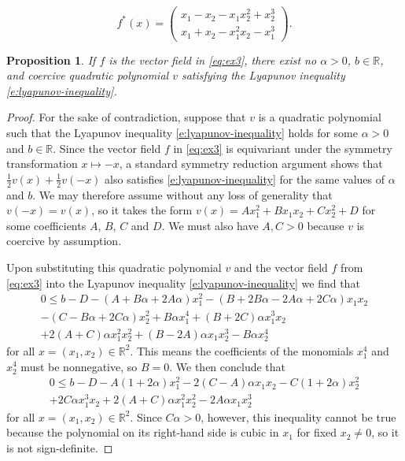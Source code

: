 \documentclass[10pt,a4paper]{amsart}
\newtheorem{proposition}{Proposition}
\newcommand{\R}{\mathbb{R}}
\renewcommand{\vec}[1]{{#1}}
\begin{document}
\begin{equation}\label{eq:ex3}
f^*(\vec{x}) =
\begin{pmatrix}
x_1 - x_2 - x_1 x_2^{2} + x_2^{3} \\
x_1 + x_2 - x_1^{2} x_2 - x_1^{3}
\end{pmatrix}.
\end{equation}

\begin{proposition}
    If $f$ is the vector field in \cref{eq:ex3}, there exist no $\alpha>0$, $b\in \R$, and coercive quadratic polynomial $v$ satisfying the Lyapunov inequality \cref{e:lyapunov-inequality}.
\end{proposition} 

\begin{proof}
    For the sake of contradiction, suppose that $v$ is a quadratic polynomial such that the Lyapunov inequality \cref{e:lyapunov-inequality} holds for some $\alpha>0$ and $b\in\R$.
    Since the vector field $\vec{f}$ in \cref{eq:ex3} is equivariant under the symmetry transformation $x\mapsto -x$, a standard symmetry reduction argument shows that $\frac12 v(\vec{x})+ \frac12v(-\vec{x})$ also satisfies \cref{e:lyapunov-inequality} for the same values of $\alpha$ and $b$. We may therefore assume without any loss of generality that $v(-\vec{x})=v(\vec{x})$, so it takes the form
    $v(x) = A x_1^2 + B x_1 x_2 + C x_2^2 + D$ 
    for some coefficients $A$, $B$, $C$ and $D$. We must also have $A,C>0$ because $v$ is coercive by assumption.
    
    Upon substituting this quadratic polynomial $v$ and the vector field $\vec{f}$ from \cref{eq:ex3} into the Lyapunov inequality \cref{e:lyapunov-inequality} we find that
    \begin{align*}
        0\leq 
        b - D
        - (A + B\alpha +2A\alpha)x_1^2 
        - (B+2B\alpha-2A\alpha+2C\alpha)x_1 x_2
        \\
        - (C - B\alpha +2C\alpha) x_2^2 
        + B\alpha x_1^4 
        + (B + 2C)\alpha x_1^3 x_2
        \\
        + 2(A+C)\alpha x_1^2 x_2^2
        + (B - 2A)\alpha x_1 x_2^3
        - B \alpha x_2^4
    \end{align*}
    for all $\vec{x}=(x_1,x_2)\in\R^2$.
    This means the coefficients of the monomials $x_1^4$ and $x_2^4$ must be nonnegative, so $B=0$. We then conclude that
    \begin{align*}
        0\leq 
        b - D
        - A(1 +2\alpha)x_1^2 
        - 2(C-A)\alpha x_1 x_2
        - C(1 +2\alpha) x_2^2 \\
        + 2C\alpha x_1^3 x_2
        + 2(A+C)\alpha x_1^2 x_2^2
        - 2A\alpha x_1 x_2^3
    \end{align*}
    for all $\vec{x}=(x_1,x_2)\in\R^2$. Since $C\alpha>0$, however,
    this inequality cannot be true because the polynomial on its right-hand side is cubic in $x_1$ for fixed $x_2\neq 0$, so it is not sign-definite.
\end{proof}
\end{document}
